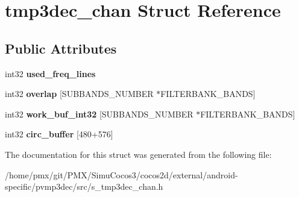 \hypertarget{structtmp3dec__chan}{}\section{tmp3dec\+\_\+chan Struct Reference}
\label{structtmp3dec__chan}
\subsection*{Public Attributes}
\begin{DoxyCompactItemize}
\item 
\mbox{\label{structtmp3dec__chan_a242ada790b7ea22f0dc3867031206ce3}} 
int32 {\bfseries used\+\_\+freq\+\_\+lines}
\item 
\mbox{\label{structtmp3dec__chan_aceb941277caef380487e838043745b35}} 
int32 {\bfseries overlap} \mbox{[}S\+U\+B\+B\+A\+N\+D\+S\+\_\+\+N\+U\+M\+B\+ER $\ast$F\+I\+L\+T\+E\+R\+B\+A\+N\+K\+\_\+\+B\+A\+N\+DS\mbox{]}
\item 
\mbox{\label{structtmp3dec__chan_a111e6ec74ee2f05ac477dd529e1bdc51}} 
int32 {\bfseries work\+\_\+buf\+\_\+int32} \mbox{[}S\+U\+B\+B\+A\+N\+D\+S\+\_\+\+N\+U\+M\+B\+ER $\ast$F\+I\+L\+T\+E\+R\+B\+A\+N\+K\+\_\+\+B\+A\+N\+DS\mbox{]}
\item 
\mbox{\label{structtmp3dec__chan_a87553830137738bb367814bbab0f564b}} 
int32 {\bfseries circ\+\_\+buffer} \mbox{[}480+576\mbox{]}
\end{DoxyCompactItemize}


The documentation for this struct was generated from the following file\+:\begin{DoxyCompactItemize}
\item 
/home/pmx/git/\+P\+M\+X/\+Simu\+Cocos3/cocos2d/external/android-\/specific/pvmp3dec/src/s\+\_\+tmp3dec\+\_\+chan.\+h\end{DoxyCompactItemize}
